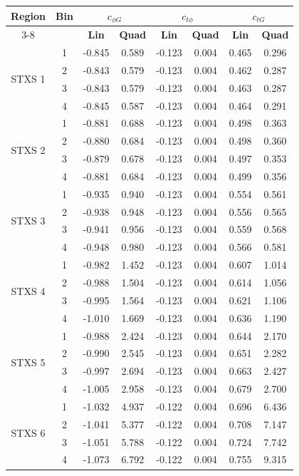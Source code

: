 \newpage
\begin{tabular}{|c|c|cc|cc|cc|}
\hline
\multirow{2}{*}{\textbf{Region}} & \multirow{2}{*}{\textbf{Bin}} & \multicolumn{2}{c|}{$c_{\phi G}$} & \multicolumn{2}{c|}{$c_{t\phi }$} & \multicolumn{2}{c|}{$c_{tG}$} \\
\cline{3-8}
 & & \textbf{Lin} & \textbf{Quad} & \textbf{Lin} & \textbf{Quad} & \textbf{Lin} & \textbf{Quad} \\
\hline
\multirow{4}{*}{STXS 1} & 1 & -0.845 & 0.589 & -0.123 & 0.004 & 0.465 & 0.296 \\
 & 2 & -0.843 & 0.579 & -0.123 & 0.004 & 0.462 & 0.287 \\
 & 3 & -0.843 & 0.579 & -0.123 & 0.004 & 0.463 & 0.287 \\
 & 4 & -0.845 & 0.587 & -0.123 & 0.004 & 0.464 & 0.291 \\
\hline
\multirow{4}{*}{STXS 2} & 1 & -0.881 & 0.688 & -0.123 & 0.004 & 0.498 & 0.363 \\
 & 2 & -0.880 & 0.684 & -0.123 & 0.004 & 0.498 & 0.360 \\
 & 3 & -0.879 & 0.678 & -0.123 & 0.004 & 0.497 & 0.353 \\
 & 4 & -0.881 & 0.684 & -0.123 & 0.004 & 0.499 & 0.356 \\
\hline
\multirow{4}{*}{STXS 3} & 1 & -0.935 & 0.940 & -0.123 & 0.004 & 0.554 & 0.561 \\
 & 2 & -0.938 & 0.948 & -0.123 & 0.004 & 0.556 & 0.565 \\
 & 3 & -0.941 & 0.956 & -0.123 & 0.004 & 0.559 & 0.568 \\
 & 4 & -0.948 & 0.980 & -0.123 & 0.004 & 0.566 & 0.581 \\
\hline
\multirow{4}{*}{STXS 4} & 1 & -0.982 & 1.452 & -0.123 & 0.004 & 0.607 & 1.014 \\
 & 2 & -0.988 & 1.504 & -0.123 & 0.004 & 0.614 & 1.056 \\
 & 3 & -0.995 & 1.564 & -0.123 & 0.004 & 0.621 & 1.106 \\
 & 4 & -1.010 & 1.669 & -0.123 & 0.004 & 0.636 & 1.190 \\
\hline
\multirow{4}{*}{STXS 5} & 1 & -0.988 & 2.424 & -0.123 & 0.004 & 0.644 & 2.170 \\
 & 2 & -0.990 & 2.545 & -0.123 & 0.004 & 0.651 & 2.282 \\
 & 3 & -0.997 & 2.694 & -0.123 & 0.004 & 0.663 & 2.427 \\
 & 4 & -1.005 & 2.958 & -0.123 & 0.004 & 0.679 & 2.700 \\
\hline
\multirow{4}{*}{STXS 6} & 1 & -1.032 & 4.937 & -0.122 & 0.004 & 0.696 & 6.436 \\
 & 2 & -1.041 & 5.377 & -0.122 & 0.004 & 0.708 & 7.147 \\
 & 3 & -1.051 & 5.788 & -0.122 & 0.004 & 0.724 & 7.742 \\
 & 4 & -1.073 & 6.792 & -0.122 & 0.004 & 0.755 & 9.315 \\
\hline
\end{tabular}
\caption{Merged linear and quadratic modifications for $c_{\phi G}$, $c_{tG}$, and $c_{t\phi}$ in all signal regions.}
\label{tab:big_quad_regions}
\newpage
